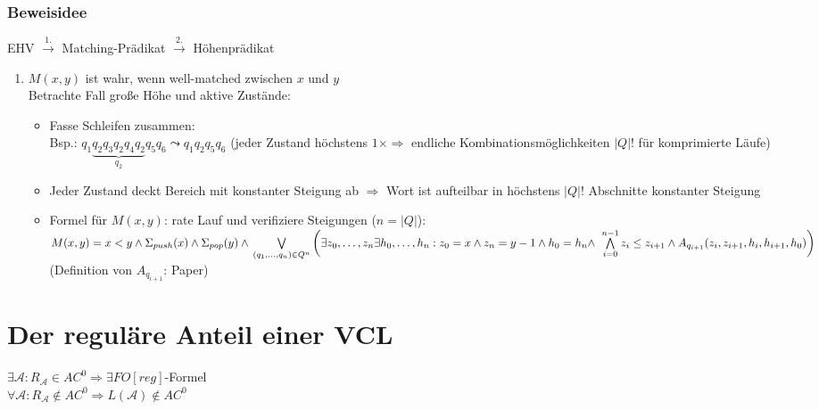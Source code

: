         \subsubsection{Beweisidee}
            EHV $\overset{1.}{\rightarrow}$ Matching-Prädikat $\overset{2.}{\rightarrow}$ Höhenprädikat
            \begin{enumerate}
                \item $M(x,y)$ ist wahr, wenn well-matched zwischen $x$ und $y$\\
                    Betrachte Fall große Höhe und aktive Zustände:\\
                    \begin{itemize}
                        \item Fasse Schleifen zusammen:\\
                            Bsp.: $q_1\underbrace{q_2q_3q_2q_4q_2}_{q_2}q_5q_6\leadsto q_1q_2q_5q_6$
                            (jeder Zustand höchstens $1\times\Rightarrow$ endliche Kombinationsmöglichkeiten $|Q|!$ für komprimierte Läufe)
                        \item Jeder Zustand deckt Bereich mit konstanter Steigung ab $\Rightarrow$ Wort ist aufteilbar in höchstens $|Q|!$ Abschnitte konstanter Steigung
                        \item Formel für $M(x,y)$: rate Lauf und verifiziere Steigungen ($n=|Q|$):\\
                        $M(x,y)=x<y\wedge\Sigmapush(x)\wedge\Sigmapop(y)\wedge\\
                        \bigvee\limits_{(q_1,\dots,q_n)\in Q^n}
                        \left(\vphantom{\bigwedge\limits_{i=0}^{n-1}} %
                        \exists z_0,\dots,z_n\exists h_0,\dots,h_n: z_0=x\wedge z_n=y-1\wedge h_0=h_n\wedge\right.\\
                        \left.\bigwedge\limits_{i=0}^{n-1}z_i\le z_{i+1}\wedge A_{q_{i+1}}(z_i,z_{i+1},h_i,h_{i+1},h_0)\right)$ (Definition von $A_{q_{i+1}}$: Paper)
                    \end{itemize}
            \end{enumerate}
\section{Der reguläre Anteil einer VCL}
    $\exists \mathcal{A}:R_\mathcal{A}\in AC^0\Rightarrow \exists FO[reg]$-Formel\\
    $\forall\mathcal{A}:R_\mathcal{A}\not\in AC^0\Rightarrow L(\mathcal{A})\not\in AC^0$
